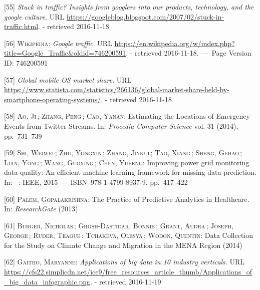 \documentclass[12pt,english,a4paper,titlepage,cleardoublepage=empty,dottedtoc]{report}
\begin{document}
\hypertarget{ref-web_2007_introducing-google-traffic}{}
{[}55{]} \emph{Stuck in traffic? Insights from googlers into our
products, technology, and the google culture}. URL
\url{https://googleblog.blogspot.com/2007/02/stuck-in-traffic.html}. -
retrieved 2016-11-18

\hypertarget{ref-web_2016_wikipedia_google-traffic}{}
{[}56{]} \textsc{Wikipedia}: \emph{Google traffic}. URL
\url{https://en.wikipedia.org/w/index.php?title=Google_Traffic\&oldid=746200591}.
- retrieved 2016-11-18. ---~Page Version ID: 746200591

\hypertarget{ref-graphic_2016_global-mobile-os-market-share}{}
{[}57{]} \emph{Global mobile OS market share}. URL
\url{https://www.statista.com/statistics/266136/global-market-share-held-by-smartphone-operating-systems/}.
- retrieved 2016-11-18

\hypertarget{ref-estimating-the-locations-of-emergency-events-from-twitter-streams_2014}{}
{[}58{]} \textsc{Ao, Ji}\,; \textsc{Zhang, Peng}\,; \textsc{Cao, Yanan}:
Estimating the Locations of Emergency Events from Twitter Streams. In:
\emph{Procedia Computer Science} vol. 31 (2014), pp.~731--739

\hypertarget{ref-paper_2015_improving-power-grid-monitoring-data-quality-an-efficient-machine-learning-framework-for-missing-data-prediction}{}
{[}59{]} \textsc{Shi, Weiwei}\,; \textsc{Zhu, Yongxin}\,; \textsc{Zhang,
Jinkui}\,; \textsc{Tao, Xiang}\,; \textsc{Sheng, Gehao}\,; \textsc{Lian,
Yong}\,; \textsc{Wang, Guoxing}\,; \textsc{Chen, Yufeng}: Improving
power grid monitoring data quality: An efficient machine learning
framework for missing data prediction. In: ~: IEEE, 2015
---~ISBN~978-1-4799-8937-9, pp.~417--422

\hypertarget{ref-the-practice-of-predictive-analytics-in-healthcare_2013}{}
{[}60{]} \textsc{Palem, Gopalakrishna}: The Practice of Predictive
Analytics in Healthcare. In: \emph{ResearchGate} (2013)

\hypertarget{ref-data-collection-for-climate-changes_2014}{}
{[}61{]} \textsc{Burger, Nicholas}\,; \textsc{Ghosh-Dastidar, Bonnie}\,;
\textsc{Grant, Audra}\,; \textsc{Joseph, George}\,; \textsc{Ruder,
Teague}\,; \textsc{Tchakeva, Olesya}\,; \textsc{Wodon, Quentin}: Data
Collection for the Study on Climate Change and Migration in the MENA
Region (2014)

\hypertarget{ref-graphic_2015_applications-of-big-data-in-10-industry-verticals}{}
{[}62{]} \textsc{Gaitho, Maryanne}: \emph{Applications of big data in 10
industry verticals}. URL
\url{https://cfs22.simplicdn.net/ice9/free_resources_article_thumb/Applications_of_big_data_infographic.png}.
- retrieved 2016-11-19
\end{document}
